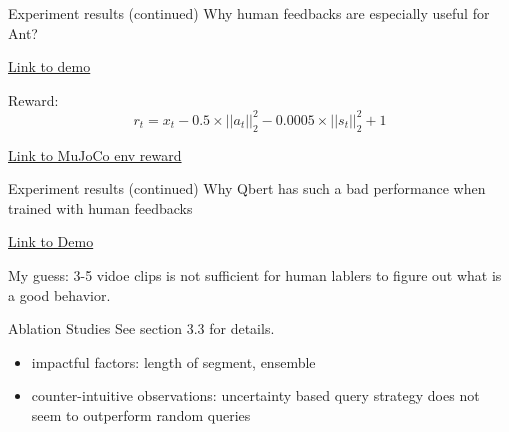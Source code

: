 \documentclass{beamer}
\begin{document}
\begin{frame}{Experiment results (continued)}
Why human feedbacks are especially useful for Ant?

  \href{https://www.youtube.com/results?search_query=ant+mujoco}{Link to demo}

Reward:
\[
    r_t = x_t - 0.5 \times ||a_t||^2_2 - 0.0005 \times ||s_t||^2_2 + 1
\]

\href{http://proceedings.mlr.press/v139/furuta21a/furuta21a-supp.pdf}{Link to MuJoCo env reward}
\end{frame}

\begin{frame}{Experiment results (continued)}
Why Qbert has such a bad performance when trained with human feedbacks

  \href{https://www.youtube.com/watch?v=vkZhWsiHCqM&t=141s}{Link to Demo}

My guess: 3-5 vidoe clips is not sufficient for human lablers to 
figure out what is a good behavior.
\end{frame}

\begin{frame}{Ablation Studies}
See section 3.3 for details. 
\begin{itemize}
  \item impactful factors: length of segment, ensemble
  \item counter-intuitive observations: uncertainty based query strategy
        does not seem to outperform random queries
\end{itemize}
\end{frame}
\end{document}
